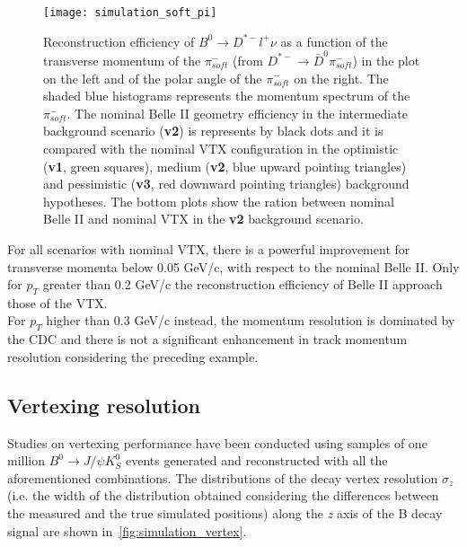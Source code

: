 \begin{figure}[h!]
\centering
\texttt{[image: simulation\_soft\_pi]}
\caption{Reconstruction efficiency of $B^{0} \rightarrow D^{*-}l^{+}\nu$ as a function of the transverse momentum of the $\pi_{soft}^{-}$ (from  $D^{*-} \rightarrow \bar{D}^{0} \pi^{-}_{soft}$) in the plot on the left and of the polar angle of the $\pi_{soft}^{-}$ on the right. 
The shaded blue histograms represents the momentum spectrum of the  $\pi_{soft}^{-}$.
The nominal Belle II geometry efficiency in the intermediate background scenario (\textbf{v2}) is represents by black dots and it is compared with the nominal VTX configuration in the optimistic (\textbf{v1}, green squares), medium (\textbf{v2}, blue upward pointing triangles) and pessimistic (\textbf{v3}, red downward
pointing triangles) background hypotheses. The bottom plots show the ration between nominal Belle II and nominal VTX in the \textbf{v2} background scenario.}
\label{fig:simulation_soft_pi}
\end{figure}

For all scenarios with nominal VTX, there is a powerful improvement for transverse momenta below 0.05 GeV/c, with respect to the nominal Belle II. Only for $p_{T}$ greater than 0.2 GeV/c the reconstruction efficiency of Belle II approach those of the VTX.\\

For $p_{T}$ higher than 0.3 GeV/c instead, the momentum resolution is dominated by the CDC and there is not a significant enhancement in track momentum resolution considering the preceding example.

\subsection{Vertexing resolution}

Studies on vertexing performance have been conducted using samples of one million $B^{0} \rightarrow J/\psi K_{S}^{0}$ events generated and reconstructed with all the aforementioned combinations.
The distributions of the decay vertex resolution $\sigma_{z}$ (i.e. the width of the distribution obtained considering the differences between the measured and the true simulated positions) along the \textit{z} axis of the B decay signal are shown in~\autoref{fig:simulation_vertex}.

